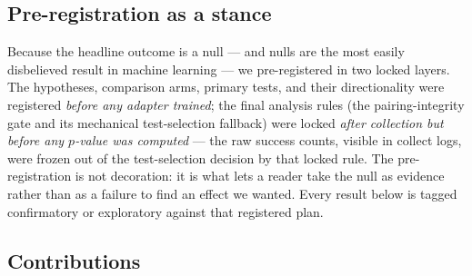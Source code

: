 \subsection*{Pre-registration as a stance}

Because the headline outcome is a null --- and nulls are the most easily
disbelieved result in machine learning --- we pre-registered in two
locked layers. The hypotheses, comparison arms, primary tests, and
their directionality were registered \emph{before any adapter trained}; the
final analysis rules (the pairing-integrity gate and its mechanical
test-selection fallback) were locked \emph{after collection but before any
$p$-value was computed} --- the raw success counts, visible in collect
logs, were frozen out of the test-selection decision by that locked
rule. The pre-registration is not decoration: it is what lets a reader
take the null as evidence rather than as a failure to find an effect we
wanted. Every result below is tagged confirmatory or exploratory
against that registered plan.

\subsection*{Contributions}

